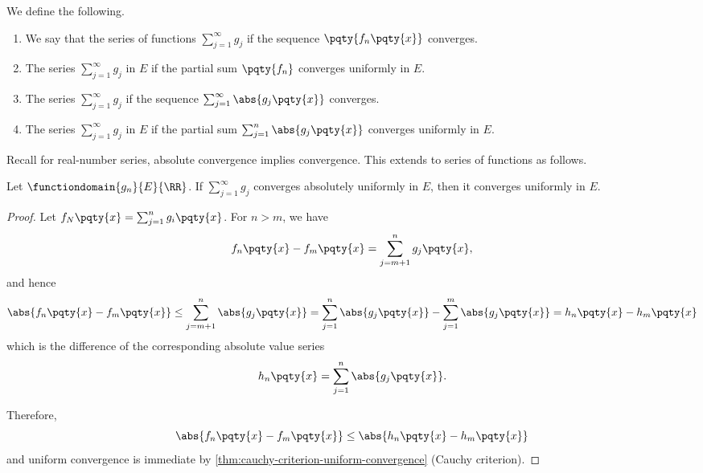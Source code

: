 \begin{definition}
    We define the following.

    \begin{enumerate}[label=(\alph*)]
        \item We say that the series of functions \(\sum_{j = 1}^{\infty} g_j\)  if the sequence \(\pqty{f_n \pqty{x}}\) converges.
        \item The series \(\sum_{j = 1}^{\infty} g_j\)  in \(E\) if the partial sum \(\pqty{f_n}\) converges uniformly in \(E\).
        \item The series \(\sum_{j = 1}^{\infty} g_j\)  if the sequence \(\sum_{j = 1}^{\infty} \abs{g_j \pqty{x}}\) converges.
        \item The series \(\sum_{j = 1}^{\infty} g_j\)  in \(E\) if the partial sum \(\sum_{j = 1}^{n} \abs{g_j \pqty{x}}\) converges uniformly in \(E\).
    \end{enumerate}
\end{definition}

Recall for real-number series, absolute convergence implies convergence. This extends to series of functions as follows.

\begin{proposition}
    Let \(\functiondomain{g_n}{E}{\RR}\). If \(\sum_{j = 1}^{\infty} g_j\) converges absolutely uniformly in \(E\), then it converges uniformly in \(E\).
\end{proposition}

\begin{proof}
    Let \(f_N \pqty{x} = \sum_{j = 1}^{n} g_i \pqty{x}\). For \(n > m\), we have
    \[
        f_n \pqty{x} - f_m \pqty{x} = \sum_{j = m + 1}^{n} g_j \pqty{x},
    \]
    and hence
    \[
        \abs{f_n \pqty{x} - f_m \pqty{x}} \leq \sum_{j = m + 1}^{n} \abs{g_j \pqty{x}} = \sum_{j = 1}^{n} \abs{g_j \pqty{x}} - \sum_{j = 1}^{m} \abs{g_j \pqty{x}} = h_n \pqty{x} - h_m\pqty{x}
    \]
    which is the difference of the corresponding absolute value series
    \[
        h_n \pqty{x} = \sum_{j = 1}^{n} \abs{g_j \pqty{x}}.
    \]

    Therefore,
    \[
        \abs{f_n\pqty{x} - f_m\pqty{x}} \leq \abs{h_n\pqty{x} - h_m\pqty{x}}
    \]
    and uniform convergence is immediate by \autoref{thm:cauchy-criterion-uniform-convergence} (Cauchy criterion).
\end{proof}


